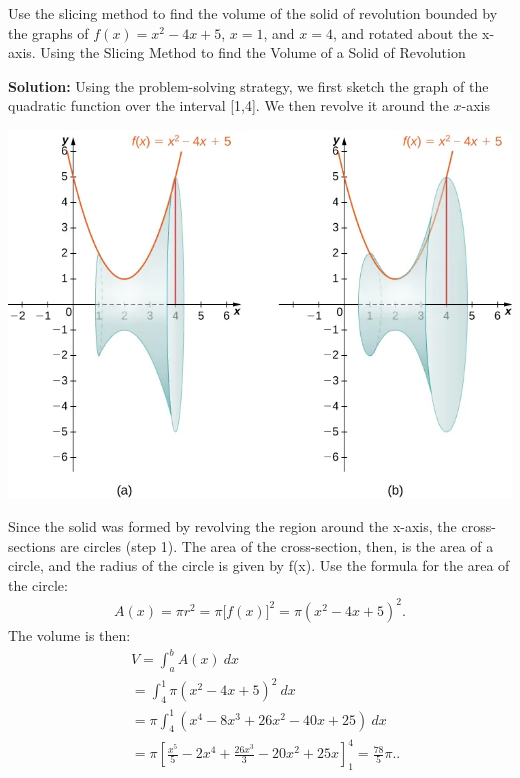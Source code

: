 \documentclass{report}
\begin{document}
\begin{minipage}[]{0.47\textwidth}
\begin{center}
        \end{center}
        \bigbreak \noindent 
    \end{minipage}
    \begin{minipage}[]{0.47\textwidth}
        \begin{eg}
            Use the slicing method to find the volume of the solid of revolution bounded by the graphs of  $f(x)=x^{2}-4x+5$, $x=1$, and $x=4$, and rotated about the  x-axis.
            Using the Slicing Method to find the Volume of a Solid of Revolution
        \end{eg}
        \bigbreak \noindent 
        \textbf{Solution:}
        Using the problem-solving strategy, we first sketch the graph of the quadratic function over the interval  [1,4]. We then revolve it around the $x$-axis
        \bigbreak \noindent 
        \begin{center}
            \includegraphics[scale=0.2]{./figures/graph21.png}
        \end{center}
        \bigbreak \noindent 
        Since the solid was formed by revolving the region around the  x-axis,
  the cross-sections are circles (step 1). The area of the cross-section, then, is the area of a circle, and the radius of the circle is given by  f(x).
  Use the formula for the area of the circle:
  \begin{align*}
      A(x) = \pi r^{2} = \pi\big[f(x)\big]^{2} = \pi(x^{2}-4x+5)^{2}
  .\end{align*}
  The volume is then:
  \begin{align*}
      &V = \int_{a}^{b} A(x)\ dx  \\
      &= \int_{4}^{1} \pi (x^2 - 4x + 5)^2\ dx  \\
      &= \pi \int_{4}^{1} (x^4 - 8x^3 + 26x^2 - 40x + 25)\ dx  \\
      &= \pi \left[ \frac{x^5}{5} - 2x^4 + \frac{26x^3}{3} - 20x^2 + 25x \right]_{1}^{4} = \frac{78}{5}\pi.
  .\end{align*}
    \end{minipage}
\end{document}

